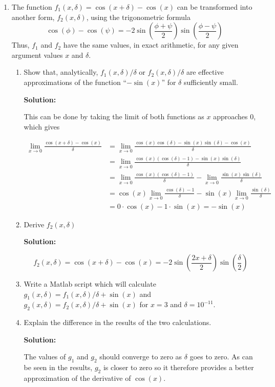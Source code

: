 \documentclass[12pt]{article}
\begin{document}
\begin{enumerate}
\item The function $f_{1}(x,\delta) = \cos(x+\delta)-\cos(x)$ can be transformed
into another form, $f_{2}(x,\delta)$, using the trigonometric formula
\[
\cos(\phi) - \cos(\psi) = -2\sin\left(\frac{\phi + \psi}{2}\right)\sin\left(\frac{\phi - \psi}{2}\right)
\]
Thus, $f_{1}$ and $f_{2}$ have the same values, in exact arithmetic, for any given
argument values $x$ and $\delta$.
\begin{enumerate}
\item Show that, analytically, $f_{1}(x,\delta)/\delta$ or $f_{2}(x,\delta)/\delta$
are effective approximations of the function ``$-\sin(x)$'' for $\delta$ sufficiently small.

{\bf Solution:}

This can be done by taking the limit of both functions as $x$ approaches $0$, which gives

\begin{align*}
\lim_{x\rightarrow 0} \frac{\cos(x + \delta) - \cos(x)}{\delta} &= \lim_{x\rightarrow 0} \frac{\cos(x)\cos(\delta) - \sin(x)\sin(\delta) -\cos(x)}{\delta}\\
      &= \lim_{x\rightarrow 0} \frac{\cos(x)\left(\cos(\delta)-1\right) - \sin(x)\sin(\delta)}{\delta}\\
      &= \lim_{x\rightarrow 0}\frac{\cos(x)\left(\cos(\delta)-1\right)}{\delta} - \lim_{x\rightarrow 0} \frac{\sin(x)\sin(\delta)}{\delta}\\
      &= \cos(x)\lim_{x\rightarrow 0}\frac{\cos(\delta) - 1}{\delta} - \sin(x)\lim_{x\rightarrow 0}\frac{\sin(\delta)}{\delta}\\
      &= 0\cdot \cos(x) - 1 \cdot \sin(x) = -\sin(x)
\end{align*}
\item Derive $f_{2}(x,\delta)$

{\bf Solution:}

\[
f_{2}(x,\delta) = \cos(x + \delta) - \cos(x) = -2\sin\left(\frac{2x + \delta}{2}\right)\sin\left(\frac{\delta}{2}\right)
\]
\item Write a {\sc Matlab} script which will calculate $g_{1}(x,\delta) = f_{1}(x,\delta)/\delta + \sin(x)$
and $g_{2}(x,\delta) = f_{2}(x,\delta)/\delta + \sin(x)$ for $x = 3$ and $\delta = 10^{-11}$.
\item Explain the difference in the results of the two calculations.

{\bf Solution:}

The values of $g_{1}$ and $g_{2}$ should converge to zero as $\delta$ goes to zero.
As can be seen in the results, $g_{2}$ is closer to zero so it therefore provides
a better approximation of the derivative of $\cos(x)$.


\end{enumerate}
\end{enumerate}
\end{document}
